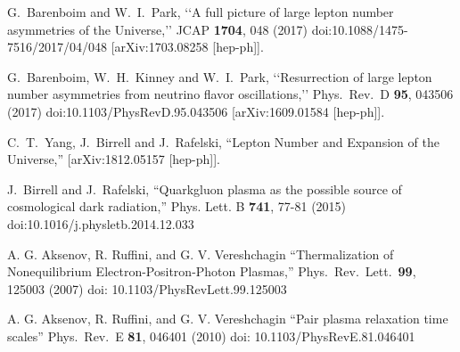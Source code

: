 \begin{thebibliography}{99}
G.~Barenboim and W.~I.~Park,
\lq\lq A full picture of large lepton number asymmetries of the Universe,\rq\rq
  JCAP {\bf 1704}, 048 (2017)
  doi:10.1088/1475-7516/2017/04/048
  [arXiv:1703.08258 [hep-ph]].

 G.~Barenboim, W.~H.~Kinney and W.~I.~Park,
 \lq\lq Resurrection of large lepton number asymmetries from neutrino flavor oscillations,\rq\rq
  Phys.\ Rev.\ D {\bf 95}, 043506 (2017)
  doi:10.1103/PhysRevD.95.043506
  [arXiv:1609.01584 [hep-ph]].


C.~T.~Yang, J.~Birrell and J.~Rafelski,
``Lepton Number and Expansion of the Universe,''
[arXiv:1812.05157 [hep-ph]].

J.~Birrell and J.~Rafelski,
``Quark\textendash{}gluon plasma as the possible source of cosmological dark radiation,''
Phys. Lett. B \textbf{741}, 77-81 (2015)
doi:10.1016/j.physletb.2014.12.033

A. G. Aksenov, R. Ruffini, and G. V. Vereshchagin
``Thermalization of Nonequilibrium Electron-Positron-Photon Plasmas,''
Phys.\ Rev.\ Lett.\ \textbf{99}, 125003 (2007) 
doi: 10.1103/PhysRevLett.99.125003

A. G. Aksenov, R. Ruffini, and G. V. Vereshchagin
``Pair plasma relaxation time scales''
Phys.\ Rev.\ E \textbf{81}, 046401 (2010)
doi: 10.1103/PhysRevE.81.046401

\end{thebibliography}